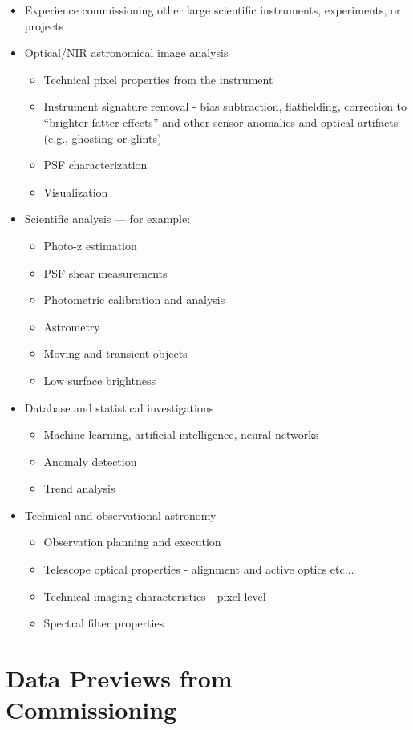 \documentclass[SE,authoryear,toc]{lsstdoc}
\begin{document}
\begin{itemize}
\item Experience commissioning other large scientific instruments, experiments, or projects
\item Optical/NIR astronomical image analysis
	\begin{itemize}
	\item Technical pixel properties from the instrument
	\item Instrument signature removal - bias subtraction, flatfielding, correction to ``brighter fatter effects'' and other sensor anomalies and optical artifacts (e.g., ghosting or glints)
	\item PSF characterization
	\item Visualization
	\end{itemize}
\item Scientific analysis --- for example:
\begin{itemize}
	\item Photo-z estimation
	\item PSF shear measurements
	\item Photometric calibration and analysis
	\item Astrometry
	\item Moving and transient objects
	\item Low surface brightness
\end{itemize}
\item Database and statistical investigations
	\begin{itemize}
	\item Machine learning, artificial intelligence, neural networks
	\item Anomaly detection
	\item Trend analysis
\end{itemize}
\item Technical and observational astronomy
	\begin{itemize}
	\item Observation planning and execution
	\item Telescope optical properties - alignment and active optics etc...
	\item Technical imaging characteristics - pixel level
	\item Spectral filter properties
	\end{itemize}
\end{itemize}

\appendix

\section{Data Previews from Commissioning}
\label{data_previews}
\end{document}

